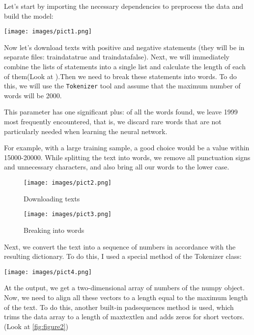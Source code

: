 \documentclass[]{article}
\begin{document}
Let's start by importing the necessary dependencies to preprocess the data and build the model:
\vspace{2mm}

\texttt{[image: images/pict1.png]}

\vspace{4mm}
Now let's download texts with positive and negative statements (they will be in separate files: train\underline{\hspace{1mm}}data\underline{\hspace{1mm}}true and train\underline{\hspace{1mm}}data\underline{\hspace{1mm}}false). Next, we will immediately combine the lists of statements into a single list and calculate the length of each of them(Look at \label{fig:figure1} ).Then we need to break these statements into words. To do this, we will use the \texttt{Tokenizer} tool and assume that the maximum number of words will be 2000.

This parameter has one significant plus: of all the words found, we leave 1999 most frequently encountered, that is, we discard rare words that are not particularly needed when learning the neural network. 

For example, with a large training sample, a good choice would be a value within 15000-20000.
While splitting the text into words, we remove all punctuation signs and unnecessary characters, and also bring all our words to the lower case.

\clearpage

\begin{figure}
\texttt{[image: images/pict2.png]}
\caption{Downloading texts}
\vspace{3mm}
\texttt{[image: images/pict3.png]}
\caption{Breaking into words}
\label{fig:figure1}
\end{figure}


Next, we convert the text into a sequence of numbers in accordance with the resulting dictionary. To do this, I used a special method of the Tokenizer class:
\vspace{2mm}

\texttt{[image: images/pict4.png]}
\vspace{3mm}

At the output, we get a two-dimensional array of numbers of the numpy object. Now, we need to align all these vectors to a length equal to the maximum length of the text. To do this, another built-in pad\underline{\hspace{1mm}}sequences method is used, which trims the data array to a length of max\underline{\hspace{1mm}}text\underline{\hspace{1mm}}len and adds zeros for short vectors.(Look at \ref{fig:figure2})
\vspace{2mm}
\end{document}
